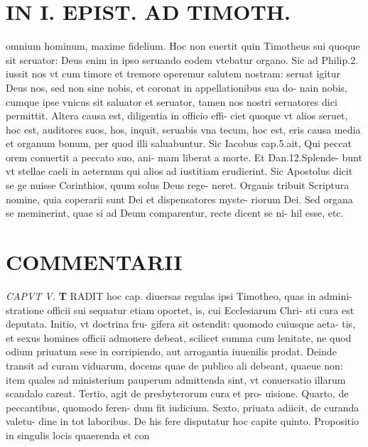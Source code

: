 \documentclass{article}
\begin{document}
\begin{pages}
\section*{IN I. EPIST. AD TIMOTH. }
\marginpar{[ p.115 ]}\pstart omnium hominum, maxime fidelium. Hoc non euertit quin Timotheus sui quoque sit seruator: Deus enim in ipso seruando eodem vtebatur organo. Sic ad Philip.2. iussit nos vt cum timore et tremore operemur salutem nostram: seruat igitur Deus nos, sed non sine nobis, et coronat in appellationibus sua do- nain nobis, cumque ipse vnicus sit saluator et seruator, tamen nos nostri seruatores dici permittit.  \pend\pstart Altera causa est, diligentia in officio effi- ciet quoque vt alios seruet, hoc est, auditores suos, hos, inquit, seruabis vna tecum, hoc est, eris causa media et organum bonum, per quod illi saluabuntur. Sic Iacobus cap.5.ait, Qui peccat orem conuertit a peccato suo, ani- mam liberat a morte. Et Dan.12.Splende- bunt vt stellae caeli in aeternum qui alios ad iustitiam erudierint. Sic Apostolus dicit se ge nuisse Corinthios, quum solus Deus rege- neret.  \pend\pstart Organis tribuit Scriptura nomine, quia coperarii sunt Dei et dispensatores myste- riorum Dei. Sed organa se meminerint, quae si ad Deum comparentur, recte dicent se ni- hil esse, etc.  \pend
\marginpar{[ p.116 ]}
\section*{COMMENTARII }
\textit{CAPVT V. }
\textbf{T }\pstart RADIT hoc cap. diuersas regulas ipsi Timotheo, quas in admini- stratione officii sui sequatur etiam oportet, is, cui Ecclesiarum Chri- sti cura est deputata. Initio, vt doctrina fru- gifera sit ostendit: quomodo cuiusque aeta- tis, et sexus homines officii admonere debeat, scilicet summa cum lenitate, ne quod odium priuatum sese in corripiendo, aut arrogantia iuuenilis prodat.  \pend\pstart Deinde transit ad curam viduarum, docems quae de publico ali debeant, quaeue non: item quales ad ministerium pauperum admittenda sint, vt conuersatio illarum scandalo careat.  \pend\pstart Tertio, agit de presbyterorum cura et pro- uisione.  \pend\pstart Quarto, de peccantibus, quomodo feren- dum fit iudicium.  \pend\pstart Sexto, priuata adiicit, de curanda valetu- dine in tot laboribus. De his fere disputatur hoc capite quinto.  \pend\pstart Propositio in singulis locis quaerenda et con  \pend

\end{pages}
\end{document}
